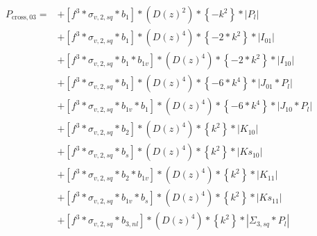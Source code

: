 \documentclass{article}
\begin{document}
\begin{equation}
\begin{aligned} 
P_{\mathrm{cross},03}=
&+\left[f^{3}*\sigma_{v,2,sq}*b_{1}\right]*\left(D(z)^{2}\right)*\left\{-k^{2}\right\}*\left|P_l\right| \\
&+\left[f^{3}*\sigma_{v,2,sq}*b_{1}\right]*\left(D(z)^{4}\right)*\left\{-2*k^{2}\right\}*\left|I_{01}\right| \\
&+\left[f^{3}*\sigma_{v,2,sq}*b_{1}*b_{1v}\right]*\left(D(z)^{4}\right)*\left\{-2*k^{2}\right\}*\left|I_{10}\right| \\
&+\left[f^{3}*\sigma_{v,2,sq}*b_{1}\right]*\left(D(z)^{4}\right)*\left\{-6*k^{4}\right\}*\left|J_{01}*P_l\right| \\
&+\left[f^{3}*\sigma_{v,2,sq}*b_{1v}*b_{1}\right]*\left(D(z)^{4}\right)*\left\{-6*k^{4}\right\}*\left|J_{10}*P_l\right| \\
&+\left[f^{3}*\sigma_{v,2,sq}*b_{2}\right]*\left(D(z)^{4}\right)*\left\{k^{2}\right\}*\left|K_{10}\right| \\
&+\left[f^{3}*\sigma_{v,2,sq}*b_{s}\right]*\left(D(z)^{4}\right)*\left\{k^{2}\right\}*\left|Ks_{10}\right| \\
&+\left[f^{3}*\sigma_{v,2,sq}*b_{2}*b_{1v}\right]*\left(D(z)^{4}\right)*\left\{k^{2}\right\}*\left|K_{11}\right| \\
&+\left[f^{3}*\sigma_{v,2,sq}*b_{1v}*b_{s}\right]*\left(D(z)^{4}\right)*\left\{k^{2}\right\}*\left|Ks_{11}\right| \\
&+\left[f^{3}*\sigma_{v,2,sq}*b_{3,nl}\right]*\left(D(z)^{4}\right)*\left\{k^{2}\right\}*\left|\Sigma_{3,sq}*P_l\right| \\
\end{aligned}
\end{equation}
\end{document}
